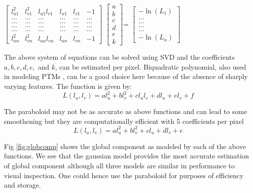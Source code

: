 \begin{center}
$\left[ {\begin{array}{cccccc}
 l_{u1}^2 & l_{v1}^2 & l_{u1}l_{v1} & l_{u1} & l_{v1} & -1 \\
  \dots & \dots  & \dots & \dots & \dots &  \dots \\
\dots & \dots  & \dots & \dots & \dots &  \dots \\
\dots & \dots  & \dots & \dots & \dots &  \dots \\
\dots & \dots  & \dots & \dots & \dots &  \dots \\
l_{un}^2 & l_{vn}^2 & l_{un}l_{vn} & l_{un} & l_{vn} & -1
 \end{array} } \right]
$
$\left[ {\begin{array}{c}
a\\b\\c\\d\\e\\k
 \end{array} } \right]
$=
$\left[ {\begin{array}{c}
-\ln(L_1)\\ \dots\\ \dots\\ \dots \\ \dots \\ -\ln(L_n)
 \end{array} } \right]
$\newline
\end{center}

The above system of equations can be solved using SVD and the coefficients
$a,b,c,d,e,$ and $k$, can be estimated per pixel. Biquadratic polynomial, also
used in modeling PTMs \cite{C4}, can be a good choice here because of the
absence of sharply varying features. The function is given by:
\begin{equation}
L(l_u,l_v) = al_u^2 + bl_v^2 + cl_ul_v + dl_u + el_v +f
\end{equation}

The paraboloid may not be as accurate as above functions and can lead to some
smoothening but they are computationally efficient with 5 coefficients per pixel
\begin{equation}
L(l_u,l_v)= al_u^2 + bl_v^2  + cl_u + dl_v +e
\end{equation}

Fig \ref{fig:globcomp}
shows the global component as modeled by each of the above functions. We see
that the gaussian model provides the most accurate estimation of global
component although all three models are similar in performance to visual
inspection. One could hence use the paraboloid for purposes of efficiency and
storage.

